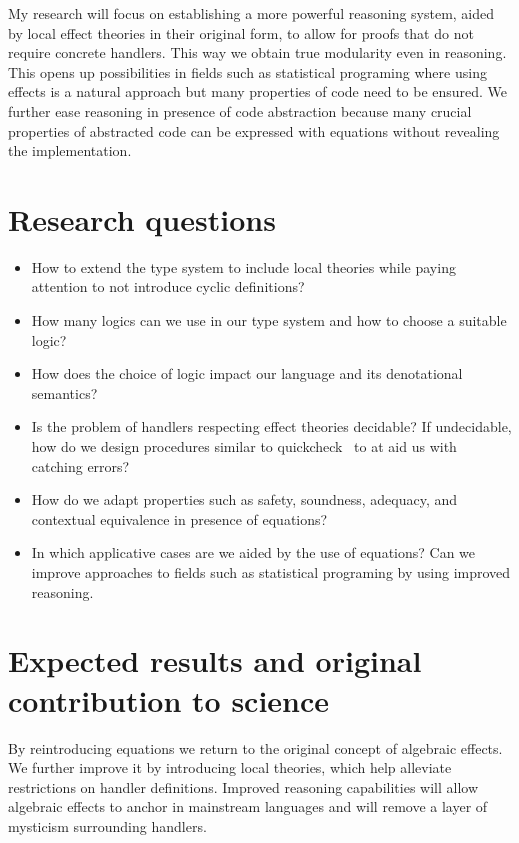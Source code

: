 \documentclass{article}
\begin{document}
My research will focus on establishing a more powerful reasoning system, aided by local effect theories in their original form, to allow for proofs that do not require concrete handlers. This way we obtain true modularity even in reasoning. This opens up possibilities in fields such as statistical programing where using effects is a natural approach but many properties of code need to be ensured. We further ease reasoning in presence of code abstraction because many crucial properties of abstracted code can be expressed with equations without revealing the implementation.


\section*{Research questions}

\begin{itemize}
  \item How to extend the type system to include local theories while paying attention to not introduce cyclic definitions?
  \item How many logics can we use in our type system and how to choose a suitable logic?
  \item How does the choice of logic impact our language and its denotational semantics?
  \item Is the problem of handlers respecting effect theories decidable? If undecidable, how do we design procedures similar to quickcheck~\cite{DBLP:conf/icfp/ClaessenH00} to at aid us with catching errors?
  \item How do we adapt properties such as safety, soundness, adequacy, and contextual equivalence in presence of equations?
  \item In which applicative cases are we aided by the use of equations?  Can we improve approaches to fields such as statistical programing by using improved reasoning.
\end{itemize}



\section*{Expected results and original contribution to science}

By reintroducing equations we return to the original concept of algebraic effects. We further improve it by introducing local theories, which help alleviate restrictions on handler definitions. Improved reasoning capabilities will allow algebraic effects to anchor in mainstream languages and will remove a layer of mysticism surrounding handlers.
\end{document}
